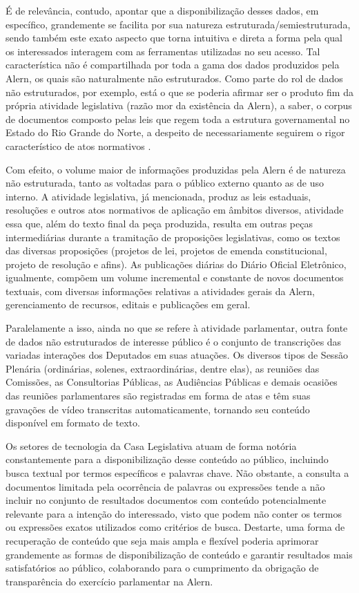 É de relevância, contudo, apontar que a disponibilização desses dados, em específico, grandemente se facilita por sua natureza estruturada/semiestruturada, sendo também este exato aspecto que torna intuitiva e direta a forma pela qual os interessados interagem com as ferramentas utilizadas no seu acesso. Tal característica não é compartilhada por toda a gama dos dados produzidos pela \ac{Alern}, os quais são naturalmente não estruturados. Como parte do rol de dados não estruturados, por exemplo, está o que se poderia afirmar ser o produto fim da própria atividade legislativa (razão mor da existência da \ac{Alern}), a saber, o corpus de documentos composto pelas leis que regem toda a estrutura governamental no Estado do Rio Grande do Norte, a despeito de necessariamente seguirem o rigor característico de atos normativos \cite{LeiRedacao:1}.

Com efeito, o volume maior de informações produzidas pela \ac{Alern} é de natureza não estruturada, tanto as voltadas para o público externo quanto as de uso interno. A atividade legislativa, já mencionada, produz as leis estaduais, resoluções e outros atos normativos de aplicação em âmbitos diversos, atividade essa que, além do texto final da peça produzida, resulta em outras peças intermediárias durante a tramitação de proposições legislativas, como os textos das diversas proposições (projetos de lei, projetos de emenda constitucional, projeto de resolução e afins). As publicações diárias do Diário Oficial Eletrônico, igualmente, compõem um volume incremental e constante de novos documentos textuais, com diversas informações relativas a atividades gerais da \ac{Alern}, gerenciamento de recursos, editais e publicações em geral.

Paralelamente a isso, ainda no que se refere à atividade parlamentar, outra fonte de dados não estruturados de interesse público é o conjunto de transcrições das variadas interações dos Deputados em suas atuações. Os diversos tipos de Sessão Plenária (ordinárias, solenes, extraordinárias, dentre elas), as reuniões das Comissões, as Consultorias Públicas, as Audiências Públicas e demais ocasiões das reuniões parlamentares são registradas em forma de atas e têm suas gravações de vídeo transcritas automaticamente, tornando seu conteúdo disponível em formato de texto.

Os setores de tecnologia da Casa Legislativa atuam de forma notória constantemente para a disponibilização desse conteúdo ao público, incluindo busca textual por termos específicos e palavras chave. Não obstante, a consulta a documentos limitada pela ocorrência de palavras ou expressões tende a não incluir no conjunto de resultados documentos com conteúdo potencialmente relevante para a intenção do interessado, visto que podem não conter os termos ou expressões exatos utilizados como critérios de busca. Destarte, uma forma de recuperação de conteúdo que seja mais ampla e flexível poderia aprimorar grandemente as formas de disponibilização de conteúdo e garantir resultados mais satisfatórios ao público, colaborando para o cumprimento da obrigação de transparência do exercício parlamentar na \ac{Alern}.

